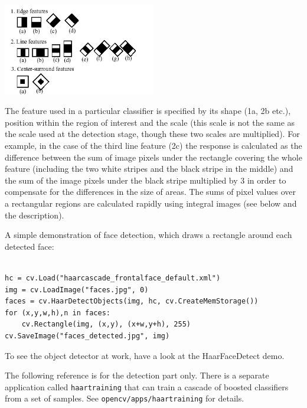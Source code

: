 \includegraphics[width=0.5\textwidth]{pics/haarfeatures.png}

The feature used in a particular classifier is specified by its shape (1a, 2b etc.), position within the region of interest and the scale (this scale is not the same as the scale used at the detection stage, though these two scales are multiplied). For example, in the case of the third line feature (2c) the response is calculated as the difference between the sum of image pixels under the rectangle covering the whole feature (including the two white stripes and the black stripe in the middle) and the sum of the image pixels under the black stripe multiplied by 3 in order to compensate for the differences in the size of areas. The sums of pixel values over a rectangular regions are calculated rapidly using integral images (see below and the  description).

\ifPy
A simple demonstration of face detection, which draws a rectangle around each detected face:

\begin{lstlisting}

hc = cv.Load("haarcascade_frontalface_default.xml")
img = cv.LoadImage("faces.jpg", 0)
faces = cv.HaarDetectObjects(img, hc, cv.CreateMemStorage())
for (x,y,w,h),n in faces:
    cv.Rectangle(img, (x,y), (x+w,y+h), 255)
cv.SaveImage("faces_detected.jpg", img)

\end{lstlisting}

\fi

\ifC
To see the object detector at work, have a look at the HaarFaceDetect demo.

The following reference is for the detection part only. There
is a separate application called \texttt{haartraining} that can
train a cascade of boosted classifiers from a set of samples. See
\texttt{opencv/apps/haartraining} for details.

\label{CvHaarFeature}
\label{CvHaarClassifier}
\label{CvHaarStageClassifier}
\label{CvHaarClassifierCascade}

